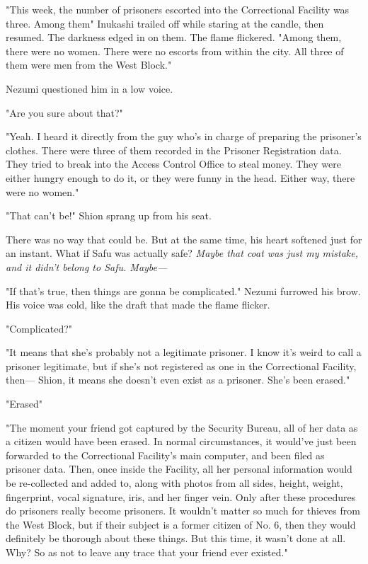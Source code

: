 "This week, the number of prisoners escorted into the Correctional
Facility was three. Among them\el " Inukashi trailed off while staring at
the candle, then resumed. The darkness edged in on them. The flame
flickered. "Among them, there were no women. There were no escorts from
within the city. All three of them were men from the West Block."

Nezumi questioned him in a low voice.

"Are you sure about that?"

"Yeah. I heard it directly from the guy who's in charge of preparing the
prisoner's clothes. There were three of them recorded in the Prisoner
Registration data. They tried to break into the Access Control Office to
steal money. They were either hungry enough to do it, or they were funny
in the head. Either way, there were no women."

"That can't be!" Shion sprang up from his seat.

There was no way that could be. But at the same time, his heart softened
just for an instant. What if Safu was actually safe? \emph{Maybe that coat was
just my mistake, and it didn't belong to Safu. Maybe---}

"If that's true, then things are gonna be complicated." Nezumi furrowed
his brow. His voice was cold, like the draft that made the flame
flicker.

"Complicated?"

"It means that she's probably not a legitimate prisoner. I know it's
weird to call a prisoner legitimate, but if she's not registered as one
in the Correctional Facility, then--- Shion, it means she doesn't even
exist as a prisoner. She's been erased."

"Erased\el "

"The moment your friend got captured by the Security Bureau, all of her
data as a citizen would have been erased. In normal circumstances, it
would've just been forwarded to the Correctional Facility's main
computer, and been filed as prisoner data. Then, once inside the
Facility, all her personal information would be re-collected and added
to, along with photos from all sides, height, weight, fingerprint, vocal
signature, iris, and her finger vein. Only after these procedures do
prisoners really become prisoners. It wouldn't matter so much for
thieves from the West Block, but if their subject is a former citizen of
No. 6, then they would definitely be thorough about these things. But
this time, it wasn't done at all. Why? So as not to leave any trace that
your friend ever existed."

